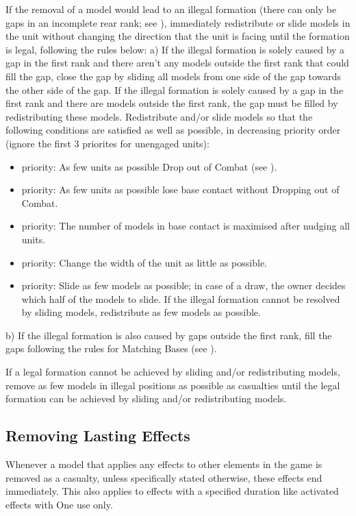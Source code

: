If the removal of a model would lead to an illegal formation (there can only be gaps in an incomplete rear rank; see ), immediately redistribute or slide models in the unit without changing the direction that the unit is facing until the formation is legal, following the rules below: \newline
a) If the illegal formation is solely caused by a gap in the first rank and there aren't any models outside the first rank that could fill the gap, close the gap by sliding all models from one side of the gap towards the other side of the gap. If the illegal formation is solely caused by a gap in the first rank and there are models outside the first rank, the gap must be filled by redistributing these models.
Redistribute and/or slide models so that the following conditions are satisfied as well as possible, in decreasing priority order (ignore the first 3 priorites for unengaged units):
\begin{itemize}
	\item {}  priority: As few units as possible Drop out of Combat (see ).
	\item {}  priority: As few units as possible lose base contact without Dropping out of Combat.
	\item {}  priority: The number of models in base contact is maximised after nudging all units.
	\item {}  priority: Change the width of the unit as little as possible.
	\item {}  priority: Slide as few models as possible; in case of a draw, the owner decides which half of the models to slide. If the illegal formation cannot be resolved by sliding models, redistribute as few models as possible.
\end{itemize}

b) If the illegal formation is also caused by gaps outside the first rank, fill the gaps following the rules for Matching Bases (see ).

If a legal formation cannot be achieved by sliding and/or redistributing models, remove as few models in illegal positions as possible as casualties until the legal formation can be achieved by sliding and/or redistributing models.

\subsection{Removing Lasting Effects}
\label{removing_lasting_effects}

Whenever a model that applies any effects to other elements in the game is removed as a casualty, unless specifically stated otherwise, these effects end immediately. This also applies to effects with a specified duration like activated effects with One use only.

\RBemc

